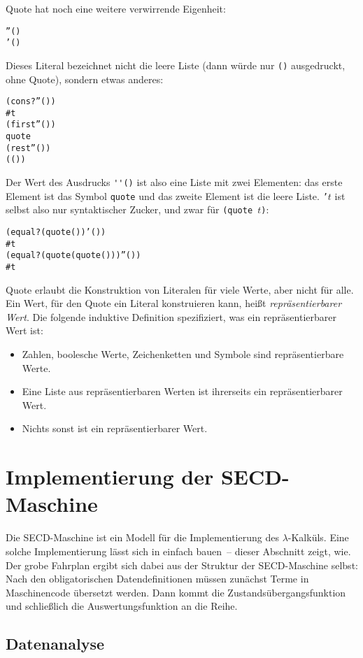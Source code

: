 Quote hat noch eine weitere verwirrende Eigenheit:
%
\begin{alltt}
''()
\evalsto{} '()
\end{alltt}
%
Dieses Literal bezeichnet nicht die leere Liste (dann würde nur
\texttt{()} ausgedruckt, ohne Quote), sondern etwas anderes:
%
\begin{alltt}
(cons? ''())
\evalsto{} #t
(first ''())
\evalsto{} quote
(rest ''())
\evalsto{} (())
\end{alltt}
%
Der Wert des Ausdrucks \verb|''()| ist also eine Liste mit zwei
Elementen: das erste Element ist das Symbol \texttt{quote} und das
zweite Element ist die leere Liste.  \texttt{'$t$}
ist selbst also nur syntaktischer Zucker, und zwar für \texttt{(quote
  $t$)}:
%
\begin{alltt}
(equal? (quote ()) '())
\evalsto{} #t
(equal? (quote (quote ())) ''())
\evalsto{} #t
\end{alltt}
%
Quote erlaubt die Konstruktion von Literalen für viele Werte, aber
nicht für alle.  Ein Wert, für den Quote ein Literal konstruieren kann,
heißt \textit{repräsentierbarer
  Wert}.  Die folgende induktive
Definition spezifiziert, was ein repräsentierbarer Wert ist:
%
\begin{itemize}
\item Zahlen, boolesche Werte, Zeichenketten und Symbole sind
  repräsentierbare Werte.
\item Eine Liste aus repräsentierbaren Werten ist ihrerseits ein
  repräsentierbarer Wert. 
\item Nichts sonst ist ein repräsentierbarer Wert.
\end{itemize}

\section{Implementierung der SECD-Maschine}

Die SECD-Maschine ist ein Modell für die Implementierung des
$\lambda$-Kalküls.  Eine solche Implementierung lässt sich in
einfach bauen~-- dieser Abschnitt zeigt, wie.  Der grobe
Fahrplan ergibt sich dabei aus der Struktur der SECD-Maschine selbst:
Nach den obligatorischen Datendefinitionen müssen zunächst Terme in
Maschinencode übersetzt werden.  Dann kommt die
Zustandsübergangsfunktion und schließlich die Auswertungsfunktion an
die Reihe.

\subsection{Datenanalyse}
\label{sec:secd-datenanalyse}

